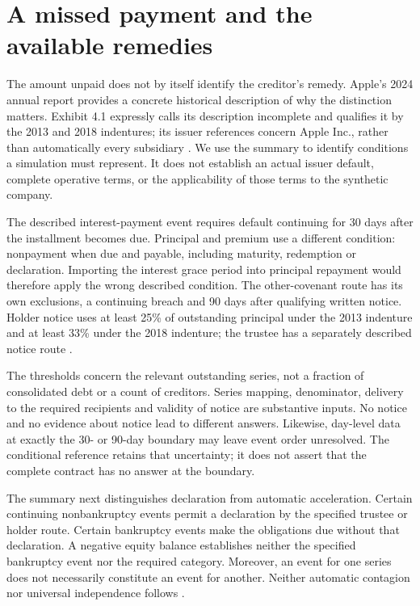 \section{A missed payment and the available remedies}
The amount unpaid does not by itself identify the creditor's remedy. Apple's
2024 annual report provides a concrete historical description of why the
distinction matters. Exhibit 4.1 expressly calls its description incomplete
and qualifies it by the 2013 and 2018 indentures; its issuer references concern
Apple Inc., rather than automatically every subsidiary
\citep[Exhibit 4.1, printed p.~3]{apple2024}. We use the summary to identify
conditions a simulation must represent. It does not establish an actual
issuer default, complete operative terms, or the applicability of those terms
to the synthetic company.

The described interest-payment event requires default continuing for 30 days
after the installment becomes due. Principal and premium use a different
condition: nonpayment when due and payable, including maturity, redemption
or declaration. Importing the interest grace period into principal repayment
would therefore apply the wrong described condition. The other-covenant route
has its own exclusions, a continuing breach and 90 days after qualifying
written notice. Holder notice uses at least 25\% of outstanding principal
under the 2013 indenture and at least 33\% under the 2018 indenture; the
trustee has a separately described notice route
\citep[Exhibit 4.1, printed p.~9]{apple2024}.

The thresholds concern the relevant outstanding series, not a fraction of
consolidated debt or a count of creditors. Series mapping, denominator,
delivery to the required recipients and validity of notice are substantive
inputs. No notice and no evidence about notice lead to different answers.
Likewise, day-level data at exactly the 30- or 90-day boundary may leave
event order unresolved. The conditional reference retains that uncertainty;
it does not assert that the complete contract has no answer at the boundary.

The summary next distinguishes declaration from automatic acceleration.
Certain continuing nonbankruptcy events permit a declaration by the specified
trustee or holder route. Certain bankruptcy events make the obligations due
without that declaration. A negative equity balance establishes neither the
specified bankruptcy event nor the required category. Moreover, an event for
one series does not necessarily constitute an event for another. Neither
automatic contagion nor universal independence follows
\citep[Exhibit 4.1, printed pp.~9--10]{apple2024}.

